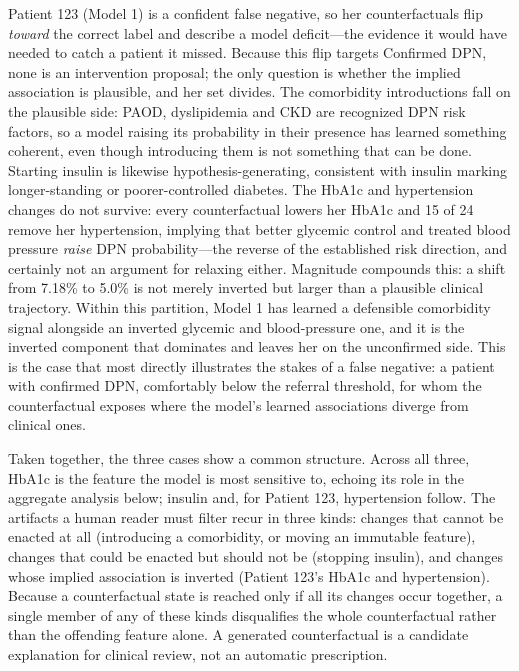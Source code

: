 \documentclass[pdflatex,sn-mathphys-num]{sn-jnl}%
\theoremstyle{thmstyleone}%
\theoremstyle{thmstyletwo}%
\theoremstyle{thmstylethree}%
\begin{document}
Patient 123 (Model 1) is a confident false negative, so her counterfactuals flip \emph{toward} the correct label and
describe a model deficit---the evidence it would have needed to catch a patient it missed. Because
this flip targets Confirmed DPN, none is an intervention proposal; the only question is whether the
implied association is plausible, and her set divides. The comorbidity introductions fall on the
plausible side: PAOD, dyslipidemia and CKD are recognized DPN risk factors, so a model raising its
probability in their presence has learned something coherent, even though introducing them is not
something that can be done. Starting insulin is likewise hypothesis-generating, consistent with
insulin marking longer-standing or poorer-controlled diabetes. The HbA1c and hypertension changes do
not survive: every counterfactual lowers her HbA1c and 15 of 24 remove her hypertension, implying that
better glycemic control and treated blood pressure \emph{raise} DPN probability---the reverse of the
established risk direction, and certainly not an argument for relaxing either. Magnitude compounds
this: a shift from 7.18\% to 5.0\% is not merely inverted but larger than a plausible clinical
trajectory. Within this partition, Model 1 has learned a defensible comorbidity signal alongside an
inverted glycemic and blood-pressure one, and it is the inverted component that dominates and leaves
her on the unconfirmed side. This is the case that most directly illustrates the stakes of a false
negative: a patient with confirmed DPN, comfortably below the referral threshold, for whom the
counterfactual exposes where the model's learned associations diverge from clinical ones.

Taken together, the three cases show a common structure. Across all three, HbA1c is the feature the model is most sensitive to, echoing its role in the
aggregate analysis below; insulin and, for Patient 123, hypertension follow. The artifacts a human
reader must filter recur in three kinds: changes that cannot be enacted at all (introducing a
comorbidity, or moving an immutable feature), changes that could be enacted but should not be
(stopping insulin), and changes whose implied association is inverted (Patient 123's HbA1c and
hypertension). Because a counterfactual state is reached only if all its changes occur together, a
single member of any of these kinds disqualifies the whole counterfactual rather than the offending
feature alone. A generated counterfactual is a candidate explanation for clinical review, not an
automatic prescription.
\end{document}
